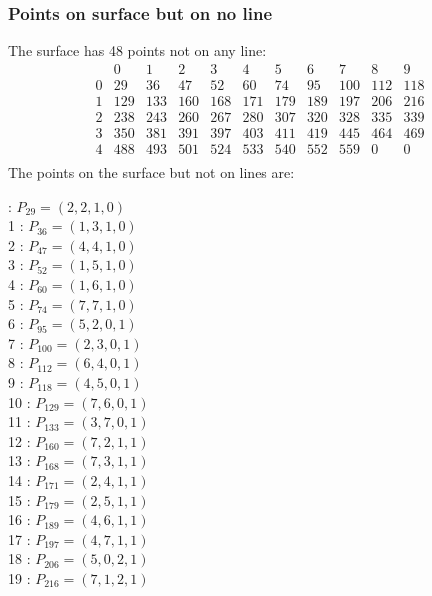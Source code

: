 \documentclass{article}
\begin{document}
{\subsubsection*{Points on surface but on no line}
The surface has 48 points not on any line:\\
$$
\begin{array}{r|*{10}{r}}
 & 0 & 1 & 2 & 3 & 4 & 5 & 6 & 7 & 8 & 9\\
\hline
0 & 29 & 36 & 47 & 52 & 60 & 74 & 95 & 100 & 112 & 118\\
1 & 129 & 133 & 160 & 168 & 171 & 179 & 189 & 197 & 206 & 216\\
2 & 238 & 243 & 260 & 267 & 280 & 307 & 320 & 328 & 335 & 339\\
3 & 350 & 381 & 391 & 397 & 403 & 411 & 419 & 445 & 464 & 469\\
4 & 488 & 493 & 501 & 524 & 533 & 540 & 552 & 559 & 0 & 0\\
\end{array}
$$
The points on the surface but not on lines are:\\
\begin{multicols}{2}
 : $P_{29}=( 2, 2, 1, 0 )$\\
1 : $P_{36}=( 1, 3, 1, 0 )$\\
2 : $P_{47}=( 4, 4, 1, 0 )$\\
3 : $P_{52}=( 1, 5, 1, 0 )$\\
4 : $P_{60}=( 1, 6, 1, 0 )$\\
5 : $P_{74}=( 7, 7, 1, 0 )$\\
6 : $P_{95}=( 5, 2, 0, 1 )$\\
7 : $P_{100}=( 2, 3, 0, 1 )$\\
8 : $P_{112}=( 6, 4, 0, 1 )$\\
9 : $P_{118}=( 4, 5, 0, 1 )$\\
10 : $P_{129}=( 7, 6, 0, 1 )$\\
11 : $P_{133}=( 3, 7, 0, 1 )$\\
12 : $P_{160}=( 7, 2, 1, 1 )$\\
13 : $P_{168}=( 7, 3, 1, 1 )$\\
14 : $P_{171}=( 2, 4, 1, 1 )$\\
15 : $P_{179}=( 2, 5, 1, 1 )$\\
16 : $P_{189}=( 4, 6, 1, 1 )$\\
17 : $P_{197}=( 4, 7, 1, 1 )$\\
18 : $P_{206}=( 5, 0, 2, 1 )$\\
19 : $P_{216}=( 7, 1, 2, 1 )$\\

\end{multicols}}
\end{document}
